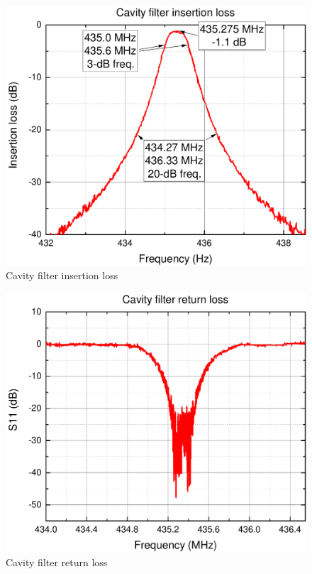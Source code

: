 \begin{figure}
    \centering
    \includegraphics[width=0.5\paperwidth]{img/5/FilterLossG.pdf}
    \caption{Cavity filter insertion loss}
    \label{cavity_filter_insertion_loss}
\end{figure}

\begin{figure}
    \centering
    \includegraphics[width=0.5\paperwidth]{img/5/FilterMatchG.pdf}
    \caption{Cavity filter return loss}
    \label{cavity_filter_return_loss}
\end{figure}




